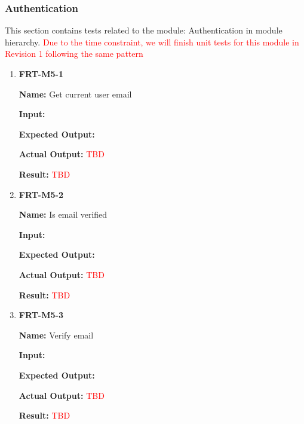 \documentclass[12pt, titlepage]{article}
\begin{document}
\subsubsection{Authentication}
This section contains tests related to the module: Authentication in module hierarchy. \textcolor{red}{Due to the time constraint, we will finish unit tests for this module in Revision 1 following the same pattern}
\begin{enumerate}
\item \textbf{FRT-M5-1}

\textbf{Name:} Get current user email

\textbf{Input:} 

\textbf{Expected Output:} 

\textbf{Actual Output:} \textcolor{red}{TBD}

\textbf{Result:} \textcolor{red}{TBD}

\item \textbf{FRT-M5-2}

\textbf{Name:} Is email verified

\textbf{Input:} 

\textbf{Expected Output:} 

\textbf{Actual Output:} \textcolor{red}{TBD}

\textbf{Result:} \textcolor{red}{TBD}

\item \textbf{FRT-M5-3}

\textbf{Name:} Verify email

\textbf{Input:} 

\textbf{Expected Output:} 

\textbf{Actual Output:} \textcolor{red}{TBD}

\textbf{Result:} \textcolor{red}{TBD}
\end{enumerate}
\end{document}
